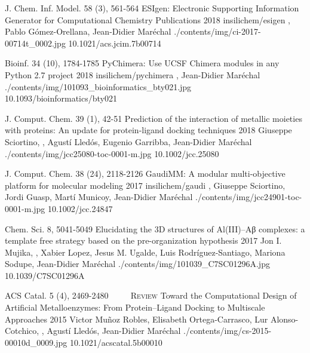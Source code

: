 \begin{cventries}
  \pubentry
    {J. Chem. Inf. Model. 58 (3), 561-564} %
    {ESIgen: Electronic Supporting Information Generator for Computational Chemistry Publications} %
    {2018} %
    {insilichem/esigen} %
    {,\textsuperscript{\dagger} Pablo Gómez-Orellana, Jean-Didier Maréchal\textsuperscript{\dagger}} %
    {./contents/img/ci-2017-00714t_0002.jpg} %
    {10.1021/acs.jcim.7b00714} %

  \pubentry
    {Bioinf. 34 (10), 1784-1785} %
    {PyChimera: Use UCSF Chimera modules in any Python 2.7 project} %
    {2018} %
    {insilichem/pychimera} %
    {,\textsuperscript{\dagger} Jean-Didier Maréchal\textsuperscript{\dagger}} %
    {./contents/img/101093_bioinformatics_bty021.jpg} %
    {10.1093/bioinformatics/bty021} %

  \pubentry
    {J. Comput. Chem. 39 (1), 42-51} %
    {Prediction of the interaction of metallic moieties with proteins: An update for protein-ligand docking techniques} %
    {2018} %
    {} %
    {Giuseppe Sciortino, , Agustí Lledós, Eugenio Garribba, Jean-Didier Maréchal} %
    {./contents/img/jcc25080-toc-0001-m.jpg} %
    {10.1002/jcc.25080} %

  \pubentry
    {J. Comput. Chem. 38 (24), 2118-2126} %
    {GaudiMM: A modular multi-objective platform for molecular modeling} %
    {2017} %
    {insilichem/gaudi} %
    {,\textsuperscript{\dagger} Giuseppe Sciortino, Jordi Guasp, Martí Municoy, Jean-Didier Maréchal\textsuperscript{\dagger}} %
    {./contents/img/jcc24901-toc-0001-m.jpg} %
    {10.1002/jcc.24847} %

  \pubentry
    {Chem. Sci. 8, 5041-5049} %
    {Elucidating the 3D structures of Al(III)–Aβ complexes: a template free strategy based on the pre-organization hypothesis} %
    {2017} %
    {} %
    {Jon I. Mujika, , Xabier Lopez, Jesus M. Ugalde, Luis Rodríguez-Santiago, Mariona Sodupe, Jean-Didier Maréchal} %
    {./contents/img/101039_C7SC01296A.jpg} %
    {10.1039/C7SC01296A} %

  \pubentry
    {ACS Catal. 5 (4), 2469-2480 ~~\cdot~~ \scshape{Review}} %
    {Toward the Computational Design of Artificial Metalloenzymes: From Protein–Ligand Docking to Multiscale Approaches} %
    {2015} %
    {} %
    {Victor Muñoz Robles, Elisabeth Ortega-Carrasco, Lur Alonso-Cotchico, , Agustí Lledós, Jean-Didier Maréchal} %
    {./contents/img/cs-2015-00010d_0009.jpg} %
    {10.1021/acscatal.5b00010} %
\end{cventries}

